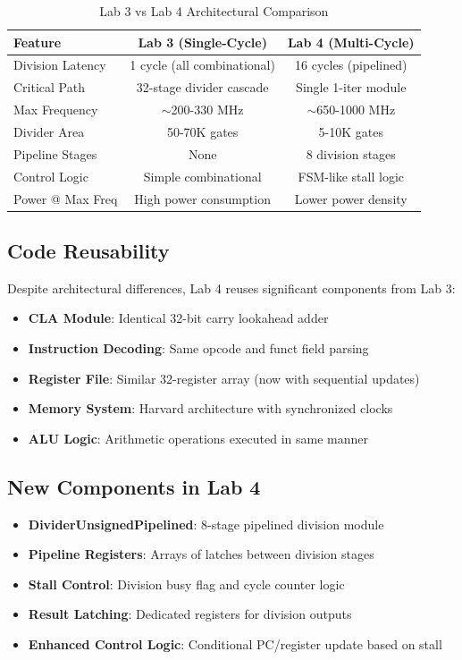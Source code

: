 \documentclass[a4paper, 11pt]{article}
\begin{document}
\begin{table}[H]
\centering
\caption{Lab 3 vs Lab 4 Architectural Comparison}
\begin{tabular}{|l|c|c|}
\hline
\textbf{Feature} & \textbf{Lab 3 (Single-Cycle)} & \textbf{Lab 4 (Multi-Cycle)} \\
\hline
Division Latency & 1 cycle (all combinational) & 16 cycles (pipelined) \\
\hline
Critical Path & 32-stage divider cascade & Single 1-iter module \\
\hline
Max Frequency & $\sim$200-330 MHz & $\sim$650-1000 MHz \\
\hline
Divider Area & 50-70K gates & 5-10K gates \\
\hline
Pipeline Stages & None & 8 division stages \\
\hline
Control Logic & Simple combinational & FSM-like stall logic \\
\hline
Power @ Max Freq & High power consumption & Lower power density \\
\hline
\end{tabular}
\end{table}

\subsection{Code Reusability}

Despite architectural differences, Lab 4 reuses significant components from Lab 3:

\begin{itemize}
    \item \textbf{CLA Module}: Identical 32-bit carry lookahead adder
    \item \textbf{Instruction Decoding}: Same opcode and funct field parsing
    \item \textbf{Register File}: Similar 32-register array (now with sequential updates)
    \item \textbf{Memory System}: Harvard architecture with synchronized clocks
    \item \textbf{ALU Logic}: Arithmetic operations executed in same manner
\end{itemize}

\subsection{New Components in Lab 4}

\begin{itemize}
    \item \textbf{DividerUnsignedPipelined}: 8-stage pipelined division module
    \item \textbf{Pipeline Registers}: Arrays of latches between division stages
    \item \textbf{Stall Control}: Division busy flag and cycle counter logic
    \item \textbf{Result Latching}: Dedicated registers for division outputs
    \item \textbf{Enhanced Control Logic}: Conditional PC/register update based on stall
\end{itemize}
\end{document}
